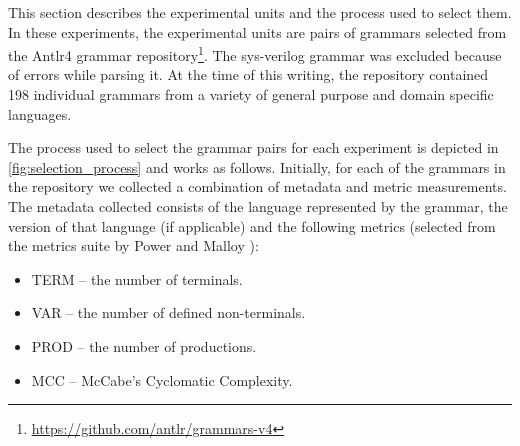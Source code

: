 \documentclass[10pt,nocc]{xrese_report}
\begin{document}
This section describes the experimental units and the process used to select them. In these experiments, the experimental units are pairs of grammars selected from the Antlr4 \cite{parr_definitive_2012} grammar repository\footnote{\url{https://github.com/antlr/grammars-v4}}. The sys-verilog grammar was excluded because of errors while parsing it. At the time of this writing, the repository contained 198 individual grammars from a variety of general purpose and domain specific languages.

The process used to select the grammar pairs for each experiment is depicted in \ref{fig:selection_process} and works as follows. Initially, for each of the grammars in the repository we collected a combination of metadata and metric measurements. The metadata collected consists of the language represented by the grammar, the version of that language (if applicable) and the following metrics (selected from the metrics suite by Power and Malloy \cite{power_metrics_2004}):

\begin{itemize}
\item TERM -- the number of terminals.
\item VAR -- the number of defined non-terminals.
\item PROD -- the number of productions.
\item MCC -- McCabe's Cyclomatic Complexity.
\end{itemize}
\end{document}
